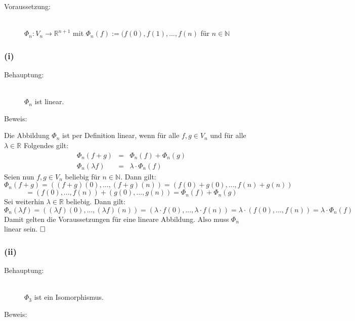 \documentclass[10pt, a4paper]{article}
\begin{document}
		\begin{description}
			\item[Voraussetzung:] \hfill \\
				$\Phi_n:V_n\longrightarrow \mathbb{R}^{n+1}$ mit $\Phi_n(f) := (f(0), f(1),...,f(n)$ für $n \in \mathbb{N}$
		\end{description}		
	
	\subsubsection*{(i)} %
	\label{ssub:subsubsection_name}
	
		\begin{description}
			\item[Behauptung:] \hfill \\
				$\Phi_n$ ist linear.
			\item[Beweis:]
		\end{description}
		
		Die Abbildung $\Phi_n$ ist per Definition linear, wenn für alle $f,g \in V_n$ und für alle $\lambda \in \mathbb{R}$ Folgendes gilt:
		\begin{eqnarray*}
			\Phi_n(f+g) &=& \Phi_n(f) + \Phi_n(g) \\
			\Phi_n(\lambda f) &=& \lambda \cdot \Phi_n(f)
		\end{eqnarray*}
		Seien nun $f,g \in V_n$ beliebig für $n \in \mathbb{N}$. Dann gilt:
		\[
			\Phi_n(f+g) = \left( (f+g)(0),...,(f+g)(n) \right) = \left( f(0)+g(0),...,f(n)+g(n) \right) 
		\]
		\[
			= \left( f(0),...,f(n) \right) + \left( g(0),...,g(n) \right) = \Phi_n(f) + \Phi_n(g)
		\]
		Sei weiterhin $\lambda \in \mathbb{R}$ beliebig. Dann gilt:
		\[
			\Phi_n(\lambda f) = \left( (\lambda f)(0),...,(\lambda f)(n) \right) = \left( \lambda \cdot f(0),... ,\lambda \cdot f(n) \right) = \lambda \cdot \left( f(0),...,f(n) \right) = \lambda \cdot \Phi_n(f)
		\]
		Damit gelten die Voraussetzungen für eine lineare Abbildung. Also muss $\Phi_n$ linear sein. $\hfill\Box$


	\subsubsection*{(ii)} %
	\label{ssub:subsubsection_name}
	
		\begin{description}
			\item[Behauptung:] \hfill \\
				$\Phi_3$ ist ein Isomorphismus.
			\item[Beweis:]
		\end{description}
		
\end{document}
